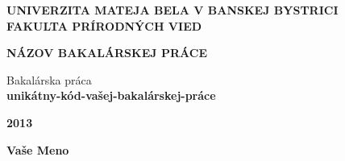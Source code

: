 \begin{titlepage}

\begin{center}

\begin{spacing}{1.5} 
{\Large \bfseries UNIVERZITA MATEJA BELA V BANSKEJ BYSTRICI\\
FAKULTA PRÍRODNÝCH VIED}\\[9cm]
\end{spacing}

\begin{spacing}{1.5} 
{\Large \bfseries NÁZOV BAKALÁRSKEJ PRÁCE}\\
\end{spacing}

{\large Bakalárska práca}\\
\bfseries unikátny-kód-vašej-bakalárskej-práce\\[5cm]
\end{center}

\vfill

\begin{minipage}{0.5\textwidth}
\begin{flushleft}
\textbf{2013}
\end{flushleft}
\end{minipage}
\begin{minipage}{0.5\textwidth}
\begin{flushright}
\textbf{Vaše Meno}
\end{flushright}
\end{minipage}

\end{titlepage}

\thispagestyle{empty}